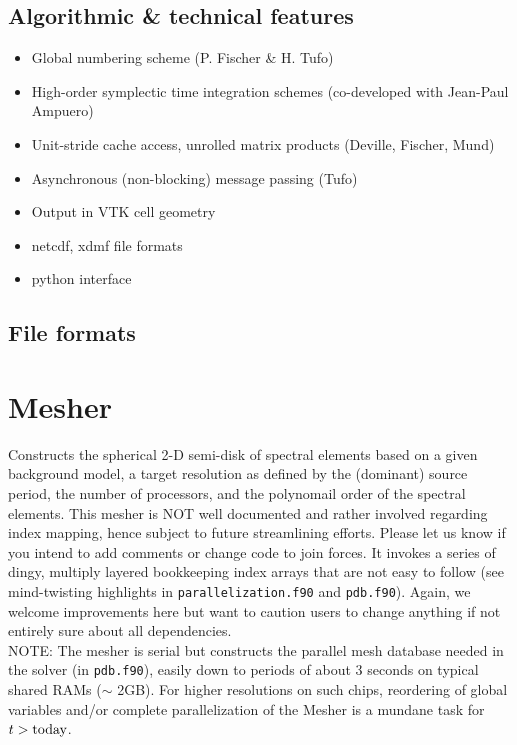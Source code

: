 \documentclass[11pt,letter,fleqn,english,notitlepage]{article}
\begin{document}
\subsection{Algorithmic \& technical features}
\begin{itemize}
\item Global numbering scheme (P. Fischer \& H. Tufo)
\item High-order symplectic time integration schemes (co-developed with Jean-Paul Ampuero)
\item Unit-stride cache access, unrolled matrix products (Deville, Fischer, Mund)
\item Asynchronous (non-blocking) message passing (Tufo)
\item Output in VTK cell geometry
\item netcdf, xdmf file formats
\item python interface 
\end{itemize}

\subsection{File formats}







\newpage
\section{Mesher}
Constructs the spherical 2-D semi-disk of spectral elements based 
on a given background model, a target resolution as defined by 
the (dominant) source period, the number of processors, 
and the polynomail order of the spectral elements. 
This mesher is NOT well documented and rather involved regarding index mapping, 
hence subject to future streamlining efforts. Please let us know if you intend to add comments or 
change code to join forces.
It invokes a series of dingy, multiply layered bookkeeping index arrays that 
are not easy to follow (see mind-twisting highlights in {\tt parallelization.f90} and {\tt pdb.f90}). 
Again, we welcome improvements here but want to caution users to change 
anything if not entirely sure about all dependencies.\\

\noindent NOTE: The mesher is serial but constructs the parallel mesh database 
needed in the solver (in {\tt pdb.f90}), easily down to periods of about 
3 seconds on typical shared RAMs ($\sim$ 2GB). 
For higher resolutions on such chips, reordering of global variables and/or complete 
parallelization of the Mesher is a mundane task for $t>{\rm today}$.
\end{document}
